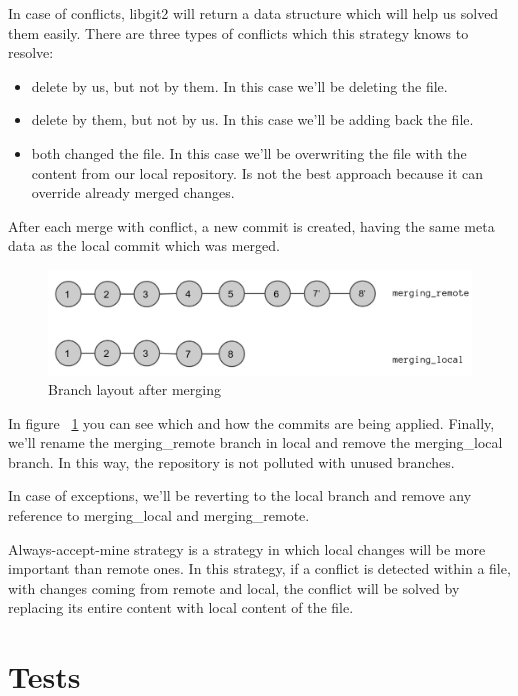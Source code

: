 In case of conflicts, libgit2 will return a data structure which will help us solved them easily. There are three types of conflicts which this strategy knows to resolve:
\begin{itemize}
    \item delete by us, but not by them. In this case we'll be deleting the file.
    \item delete by them, but not by us. In this case we'll be adding back the file.
    \item both changed the file. In this case we'll be overwriting the file with the content from our local repository. Is not the best approach because it can override already merged changes.
\end{itemize}

After each merge with conflict, a new commit is created, having the same meta data as the local commit which was merged.

\begin{figure}[h]
  \begin{center}
    \includegraphics[width=16cm]{layout/merging-end.png}
  \end{center}
  \caption{Branch layout after merging}
  \label{fig:merging}
\end{figure}

In figure ~\ref{fig:merging} you can see which and how the commits are being applied. Finally, we'll rename the merging\_remote branch in local and remove the merging\_local branch. In this way, the repository is not polluted with unused branches.

In case of exceptions, we'll be reverting to the local branch and remove any reference to merging\_local and merging\_remote.

Always-accept-mine strategy is a strategy in which local changes will be more important than remote ones. In this strategy, if a conflict is detected within a file, with changes coming from remote and local, the conflict will be solved by replacing its entire content with local content of the file.

\section{Tests}

